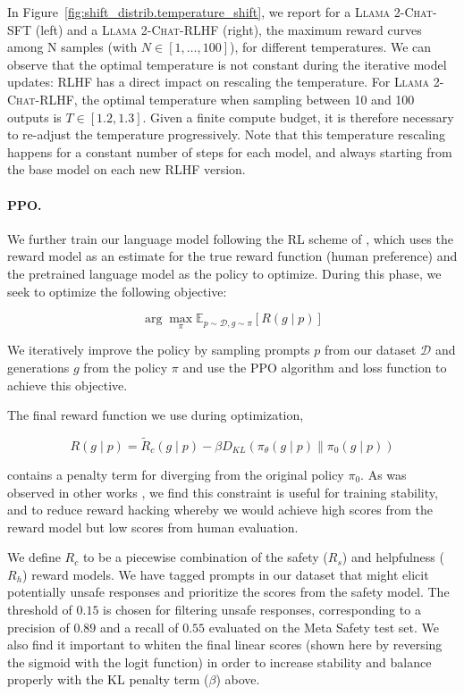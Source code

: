 In Figure~\ref{fig:shift_distrib.temperature_shift}, we report for a \textsc{Llama 2-Chat}-SFT (left) and a \textsc{Llama 2-Chat}-RLHF (right), the maximum reward curves among N samples (with $N \in [1, \ldots, 100]$), for different temperatures. We can observe that the optimal temperature is not constant during the iterative model updates: RLHF has a direct impact on rescaling the temperature. For \textsc{Llama 2-Chat}-RLHF, the optimal temperature when sampling between 10 and 100 outputs is $T \in [1.2, 1.3]$. Given a finite compute budget, it is therefore necessary to re-adjust the temperature progressively. Note that this temperature rescaling happens for a constant number of steps for each model, and always starting from the base model on each new RLHF version. 

\paragraph{PPO.}

We further train our language model following the RL scheme of \cite{stienon2020learning}, which uses the reward model as an estimate for the true reward function (human preference) and the pretrained language model as the policy to optimize. During this phase, we seek to optimize the following objective:

\begin{equation}
   \arg \max _\pi \mathbb{E}_{p \sim \mathcal{D}, g \sim \pi}[R(g \mid p)]
\end{equation}

We iteratively improve the policy by sampling prompts $p$ from our dataset $\mathcal{D}$ and generations $g$ from the policy $\pi$ and use the PPO algorithm and loss function to achieve this objective.

The final reward function we use during optimization,

\begin{equation}
   R(g \mid p) = \tilde{R}_{c}(g \mid p) - \beta D_{KL}(\pi_{\theta}(g \mid p) \parallel \pi_{0}(g \mid p))
\end{equation}

contains a penalty term for diverging from the original policy $\pi_{0}$. As was observed in other works \citep{stienon2020learning, ouyang2022training}, we find this constraint is useful for training stability, and to reduce reward hacking whereby we would achieve high scores from the reward model but low scores from human evaluation.

We define $R_c$ to be a piecewise combination of the safety ($R_s$) and helpfulness ($R_h$) reward models. We have tagged prompts in our dataset that might elicit potentially unsafe responses and prioritize the scores from the safety model. The threshold of $0.15$ is chosen for filtering unsafe responses, corresponding to a precision of $0.89$ and a recall of $0.55$ evaluated on the Meta Safety test set. We also find it important to whiten the final linear scores (shown here by reversing the sigmoid with the logit function) in order to increase stability and balance properly with the KL penalty term ($\beta$) above.

